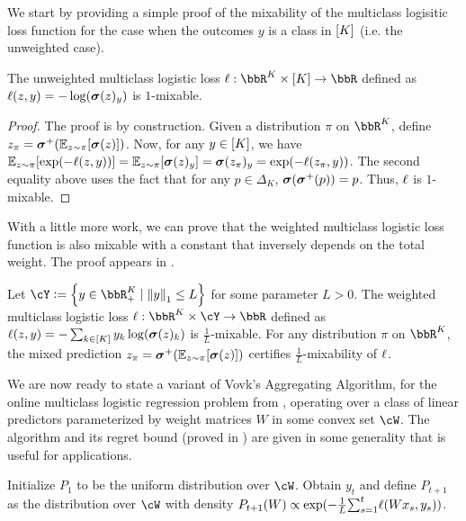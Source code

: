 
We start by providing a simple proof of the mixability of the multiclass logisitic loss function for the case when the outcomes $y$ is a class in $[K]$ (i.e. the unweighted case).
\begin{proposition} \label{prop:unweighted-mixability}
The unweighted multiclass logistic loss $\ls: \R^K \times \brk{K} \rightarrow \R$ defined as $\ell(z, y) = -\log(\boldsymbol{\sigma}(z)_y)$ is $1$-mixable.
\end{proposition}
\begin{proof}
The proof is by construction. Given a distribution $\pi$ on $\R^K$, define $z_\pi = \boldsymbol{\sigma}^{+}(\operatorname*{\mathbb{E}}_{z \sim \pi}[\boldsymbol{\sigma}(z)])$. Now, for any $y \in [K]$, we have $\operatorname*{\mathbb{E}}_{z \sim \pi}[\exp(-\ell(z, y))] = \operatorname*{\mathbb{E}}_{z \sim \pi}[\boldsymbol{\sigma}(z)_y] = \boldsymbol{\sigma}(z_\pi)_y = \exp(-\ell(z_\pi, y))$. The second equality above uses the fact that for any $p \in \Delta_K$, $\boldsymbol{\sigma}(\boldsymbol{\sigma}^{+}(p)) = p$. Thus, $\ell$ is $1$-mixable.
\end{proof}
With a little more work, we can prove that the weighted multiclass logistic loss function is also mixable with a constant that inversely depends on the total weight. The proof appears in .\vspace{-.5em}
\begin{proposition} \label{prop:generalized_multiclass_log_mixable}
Let $\cY\ldef\crl*{y\in\bbR^{K}_{+}\mid{} \nrm*{y}_{1}\leq{}L}$ for some parameter $L > 0$. The weighted multiclass logistic loss $\ls: \R^K \times \cY \rightarrow \R$ defined as $\ell(z, y) = -\sum_{k\in[K]}y_{k}\log(\boldsymbol{\sigma}(z)_{k})$ is $\frac{1}{L}$-mixable. For any distribution $\pi$ on $\R^K$, the mixed prediction $z_\pi = \boldsymbol{\sigma}^{+}(\operatorname*{\mathbb{E}}_{z \sim \pi}[\boldsymbol{\sigma}(z)])$ certifies $\frac{1}{L}$-mixability of $\ell$.
\end{proposition}

We are now ready to state a variant of Vovk's Aggregating Algorithm,  for the online multiclass logistic regression problem from , operating over a class of linear predictors parameterized by weight matrices $W$ in some convex set $\cW$. The algorithm and its regret bound (proved in ) are given in some generality that is useful for applications.

\begin{algorithm}[h]
\caption{}
\label{alg:mixing_multiclass}
\begin{algorithmic}[1]
\State Initialize $P_1$ to be the uniform distribution over $\cW$.
\State Obtain $y_t$ and define $P_{t+1}$ as the distribution over $\cW$ with density \hspace*{1in} $P_{t+1}(W) \propto \exp(-\tfrac{1}{L}\textstyle{\sum}_{s=1}^{t}\ell(Wx_s, y_s))$.
\EndFor
\EndProcedure
\end{algorithmic}
\end{algorithm}



